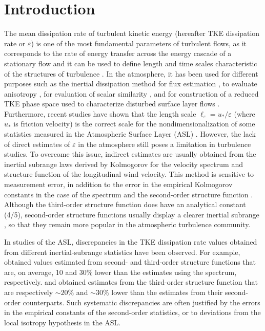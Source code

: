 \documentclass{svjour3}                     %
\begin{document}





\section{Introduction}

The mean dissipation rate of turbulent kinetic energy (hereafter TKE
dissipation rate or $\varepsilon$) is one of the most fundamental
parameters of turbulent flows, as it corresponds to the rate of energy
transfer across the energy cascade of a stationary flow and it can be
used to define length and time scales characteristic of the structures
of turbulence \citep{Pop2000, Dav2004}. In the atmosphere, it has been
used for different purposes such as the inertial dissipation method
for flux estimation \citep{FaiLar1986,HsiKat1997,Hen1998}, to evaluate
anisotropy \citep{War2000,ChaDia2004}, for evaluation of scalar
similarity \citep{CanDia2012}, and for construction of a reduced TKE
phase space used to characterize disturbed surface layer
flows \citep{ChaDia2018}. Furthermore, recent studies have shown that the length scale
$\ell_\varepsilon = u_*/\varepsilon$ (where $u_*$ is friction
velocity) is the correct scale for the nondimensionalization of some
statistics measured in the Atmospheric Surface Layer (ASL)
\citep{DavKro2014, PanCha2016, ChaDia2017}. However, the lack of
direct estimates of $\varepsilon$ in the atmosphere still poses a
limitation in turbulence studies. To overcome this issue, indirect
estimates are usually obtained from the inertial subrange laws derived
by Kolmogorov for the velocity spectrum and structure function of the
longitudinal wind velocity. This method is sensitive to measurement
error, in addition to the error in the empirical Kolmogorov constants
in the case of the spectrum and the second-order structure function
\citep{ChaDia2004}. Although the third-order structure function does
have an analytical constant (4/5), second-order structure functions
usually display a clearer inertial subrange \citep{AlbPar1997}, so
that they remain more popular in the atmospheric turbulence community.


In studies of the ASL, discrepancies in the TKE dissipation rate
values obtained from different inertial-subrange statistics have been
observed. For example, \citet{ChaDia2004} obtained values estimated
from second- and third-order structure functions that are, on average,
10 and 30\% lower than the estimates using the spectrum,
respectively. \citet{AlbPar1997} and \citet{ChaDia2017} obtained
estimates from the third-order structure function that are
respectively $\sim20\%$ and $\sim 30\%$ lower than the estimates from
their second-order counterparts. Such systematic discrepancies are
often justified by the errors in the empirical constants of the
second-order statistics, or to deviations from the local isotropy
hypothesis in the ASL.
\end{document}
